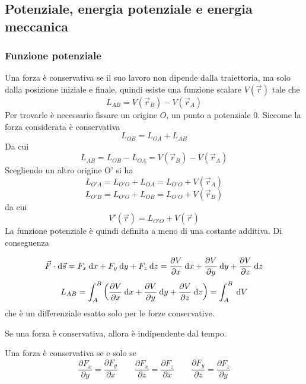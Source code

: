 \documentclass{article}
\theoremstyle{plain}
\begin{document}
\subsection{Potenziale, energia potenziale e energia meccanica}
\subsubsection{Funzione potenziale}
Una forza è conservativa se il suo lavoro non dipende dalla traiettoria, ma solo dalla posizione iniziale e finale, quindi esiste una funzione scalare $V(\vec r)$ tale che 
\[L_{AB}=V(\vec r_B)-V(\vec r_A)\]
Per trovarle è necessario fissare un origine $O$, un punto a potenziale $0$. Siccome la forza considerata è conservativa
\[L_{OB} = L_{OA} + L_{AB}\]
Da cui 
\[L_{AB} = L_{OB} - L_{OA} = V(\vec r_B) - V(\vec r_A)\]
Scegliendo un altro origine O' si ha 
\[L_{O'A} = L_{O'O} + L_{OA} = L_{O'O} + V(\vec r_A)\]
\[L_{O'B} = L_{O'O} + L_{OB} = L_{O'O} + V(\vec r_B)\]
da cui 
\[V'(\vec r) = L_{O'O} + V(\vec r)\]
La funzione potenziale è quindi definita a meno di una costante additiva. Di conseguenza 

\[\vec F\cdot \!\:\text{d} \vec s = F_x\:\text{d} x + F_y \:\text{d} y + F_z\:\text{d} z = \frac{\partial V}{\partial x}\:\text{d} x + \frac{\partial V}{\partial y}\:\text{d} y + \frac{\partial V}{\partial z} \:\text{d} z\]
\[L_{AB} =\int_A^B\left(\frac{\partial V}{\partial x}\:\text{d} x + \frac{\partial V}{\partial y}\:\text{d} y + \frac{\partial V}{\partial z} \:\text{d} z\right) =\int_A^B\:\text{d} V\]
che è un differenziale esatto solo per le forze conservative.

\begin{lemma}
    Se una forza è conservativa, allora è indipendente dal tempo.
\end{lemma}

\begin{lemma}
    Una forza è conservativa se e solo se
    \[\frac{\partial F_x}{\partial y} = \frac{\partial F_y}{\partial x}\qquad 
    \frac{\partial F_x}{\partial z} = \frac{\partial F_z}{\partial x}\qquad 
    \frac{\partial F_y}{\partial z} = \frac{\partial F_z}{\partial y}\]
\end{lemma}
\end{document}
